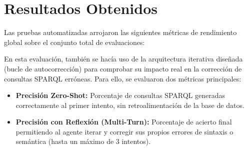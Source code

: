 \section{Resultados Obtenidos}

Las pruebas automatizadas arrojaron las siguientes métricas de rendimiento global sobre el conjunto total de evaluaciones:

\begin{table}[h]
\centering
{}
\caption{Comparativa de rendimiento, precisión y latencia entre distintos LLMs locales evaluados.}
\label{tab:comparativa_modelos}
\end{table}

En esta evaluación, también se hacía uso de la arquitectura iterativa diseñada (bucle de autocorrección) para comprobar su impacto real en la corrección de consultas SPARQL erróneas. Para ello, se evaluaron dos métricas principales:

\begin{itemize}
    \item \textbf{Precisión Zero-Shot:} Porcentaje de consultas SPARQL generadas correctamente al primer intento, sin retroalimentación de la base de datos.
    \item \textbf{Precisión con Reflexión (Multi-Turn):} Porcentaje de acierto final permitiendo al agente iterar y corregir sus propios errores de sintaxis o semántica (hasta un máximo de 3 intentos).
\end{itemize}


